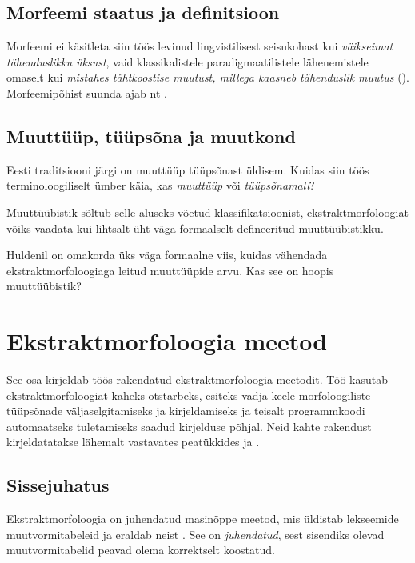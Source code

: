 \documentclass[12pt,a4paper]{article}
\begin{document}
\subsection{Morfeemi staatus ja definitsioon}
Morfeemi ei käsitleta siin töös levinud lingvistilisest seisukohast kui \textit{väikseimat tähenduslikku üksust}, vaid klassikalistele paradigmaatilistele lähenemistele omaselt kui \textit{mistahes tähtkoostise muutust, millega kaasneb tähenduslik muutus} (\cites{beard_morpheme_1987}{beard_lexeme-morpheme_1995}). Morfeemipõhist suunda ajab nt \cite{stump_inflectional_2001}.


\subsection{Muuttüüp, tüüpsõna ja muutkond}
Eesti traditsiooni järgi on muuttüüp tüüpsõnast üldisem. Kuidas siin töös terminoloogiliselt ümber käia, kas \textit{muuttüüp} või \textit{tüüpsõna\-mall}?

Muuttüübistik sõltub selle aluseks võetud klassifikatsioonist, ekstrakt\-morfoloogiat võiks vaadata kui lihtsalt üht väga formaalselt defineeritud muuttüübistikku.

Huldenil on omakorda üks väga formaalne viis, kuidas vähendada ekstrakt\-morfoloogiaga leitud muuttüüpide arvu. Kas see on hoopis muuttüübistik?




\newpage
\section{Ekstraktmorfoloogia meetod}
\label{sec:ekstraktmorfoloogia-meetod}
See osa kirjeldab töös rakendatud ekstraktmorfoloogia meetodit. Töö kasutab ekstraktmorfoloogiat kaheks otstarbeks, esiteks vadja keele morfoloogiliste tüüpsõnade väljaselgitamiseks ja kirjeldamiseks ja teisalt programmkoodi automaatseks tuletamiseks saadud kirjelduse põhjal. Neid kahte rakendust kirjeldatatakse lähemalt vastavates peatükkides \textit{} ja \textit{}.




\subsection{Sissejuhatus}
\label{sec:ekstraktmorfoloogia-sissejuhatus}

Ekstraktmorfoloogia on juhendatud masinõppe meetod, mis üldistab lekseemide muutvormitabeleid ja eraldab neist . See on \textit{juhendatud}, sest sisendiks olevad muutvormitabelid peavad olema korrektselt koostatud. %
\end{document}
